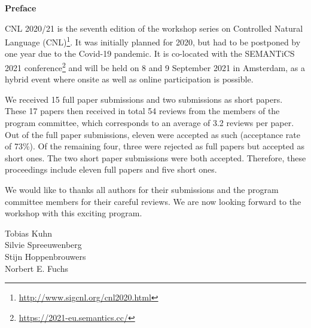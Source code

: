 \documentclass[11pt,a4paper]{article}
\begin{document}
\begin{center}
  {\Large \bf Preface}
\end{center}

\vspace*{0.5cm}

CNL 2020/21 is the seventh edition of the workshop series on Controlled Natural Language (CNL)\footnote{\url{http://www.sigcnl.org/cnl2020.html}}. It was initially planned for 2020, but had to be postponed by one year due to the Covid-19 pandemic. It is co-located with the SEMANTiCS 2021 conference\footnote{\url{https://2021-eu.semantics.cc/}} and will be held on 8 and 9 September 2021 in Amsterdam, as a hybrid event where onsite as well as online participation is possible.

We received 15 full paper submissions and two submissions as short papers. These 17 papers then received in total 54 reviews from the members of the program committee, which corresponds to an average of 3.2 reviews per paper. Out of the full paper submissions, eleven were accepted as such (acceptance rate of 73\%). Of the remaining four, three were rejected as full papers but accepted as short ones. The two short paper submissions were both accepted. Therefore, these proceedings include eleven full papers and five short ones.

We would like to thanks all authors for their submissions and the program committee members for their careful reviews. We are now looking forward to the workshop with this exciting program.

Tobias Kuhn\\
Silvie Spreeuwenberg\\
Stijn Hoppenbrouwers\\
Norbert E. Fuchs\\
 
\end{document}
